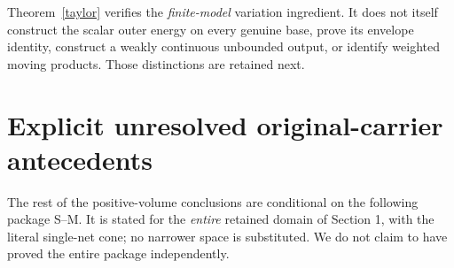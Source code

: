 \documentclass[10pt]{article}
\begin{document}
Theorem~\ref{taylor} verifies the \emph{finite-model} variation ingredient.
It does not itself construct the scalar outer energy on every genuine base,
prove its envelope identity, construct a weakly continuous unbounded output,
or identify weighted moving products. Those distinctions are retained next.

\section{Explicit unresolved original-carrier antecedents}\label{package}
The rest of the positive-volume conclusions are conditional on the following
package S--M. It is stated for the \emph{entire} retained domain of Section 1,
with the literal single-net cone; no narrower space is substituted.
We do not claim to have proved the entire package independently.
\end{document}
